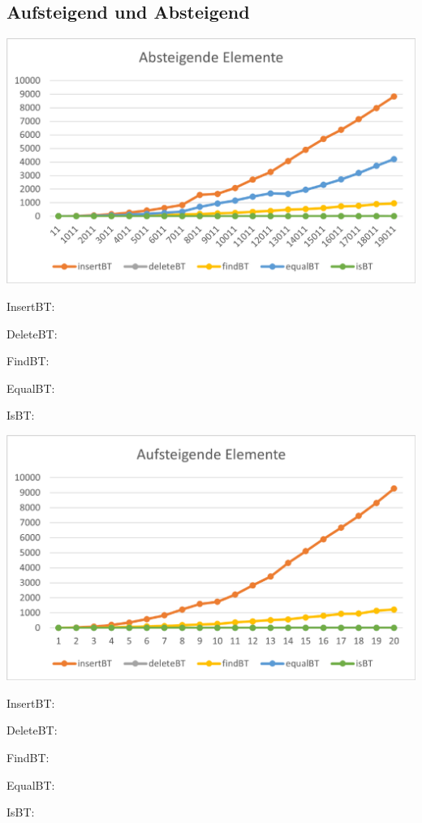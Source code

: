 \documentclass[11pt]{article}
\begin{document}
    \subsection{Aufsteigend und Absteigend}\label{subsec:average}
    \begin{center}
        \includegraphics[width=0.9\columnwidth] {ZeitAb.pdf}
        
    InsertBT:
    
    DeleteBT:
    
    FindBT:
    
    EqualBT:
    
    IsBT:

    \end{center}\begin{center}
                    \includegraphics[width=0.9\columnwidth] {ZeitAuf.pdf}
    \end{center}
    
    InsertBT:
    
    DeleteBT:
    
    FindBT:
    
    EqualBT:
    
    IsBT:
\end{document}
